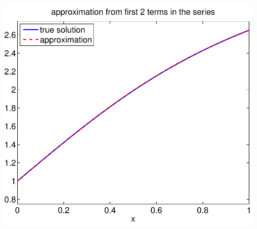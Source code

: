 {\begin{solution}
\begin{enumerate}
\begin{center}
   \includegraphics[scale=0.4]{bvps2b_2}


\end{center}
\end{enumerate}
\end{solution}}
